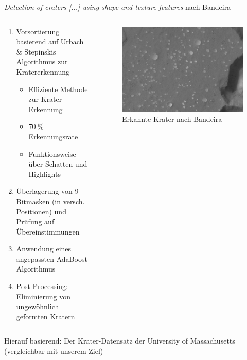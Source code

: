 \documentclass[9pt]{beamer}
\begin{document}
\begin{frame}{\textit{Detection of craters [...] using shape and texture features} nach Bandeira\cite{Bandeira2012}}
\begin{columns}
	\begin{column}{.5\textwidth}
		\begin{enumerate}
		\item Vorsortierung basierend auf Urbach \& Stepinskis Algorithmus\cite{urbach2009automatic} zur Kratererkennung
		\begin{itemize}
			\item Effiziente Methode zur Krater-Erkennung
			\item $\SI{70}{\percent}$ Erkennungsrate
			\item Funktionsweise über Schatten und Highlights
		\end{itemize}
		\item Überlagerung von 9 Bitmasken (in versch. Positionen) und Prüfung auf Übereinstimmungen
		\item Anwendung eines angepassten AdaBoost Algorithmus
		\item Post-Processing: Eliminierung von ungewöhnlich geformten Kratern
		\end{enumerate}
	\end{column}
	\begin{column}{.5\textwidth}
		\begin{figure}[H]
			\includegraphics[width=\textwidth, keepaspectratio]{bandeira_detected.png}
			\caption{Erkannte Krater nach Bandeira\cite{Bandeira2012}}
		\end{figure}
	\end{column}
\end{columns}
\bigskip
\begin{center}Hierauf basierend: Der Krater-Datensatz der University of Massachusetts\cite{umass_craters} (vergleichbar mit unserem Ziel)
\end{center}
\end{frame}
\end{document}
